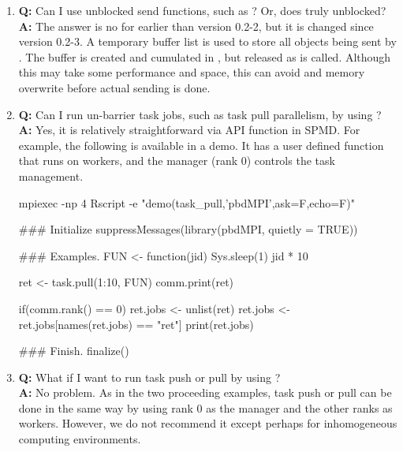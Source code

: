 \begin{enumerate}
\begin{Code}[title=SPMD R Script]
finalize()
\end{Code}


\item {\bf\color{blue} Q:}
      Can I use unblocked send functions, such as
      ? Or, does  truly unblocked? \\
      {\bf\color{blue} A:}
      The answer is no for  earlier than version 0.2-2, but
      it is changed since version 0.2-3. A temporary buffer list
       is used to store all objects being sent by
      . The buffer is created
      and cumulated in , but released as
       is called. Although this may take some performance
      and space, this can avoid  and memory overwrite before
      actual sending is done.


\item {\bf\color{blue} Q:}
      Can I run un-barrier task jobs, such as task pull parallelism,
      by using ? \\
      {\bf\color{blue} A:}
      Yes, it is relatively straightforward via  API function
       in SPMD. For example, the following is available
      in a demo. It has a user
      defined function  that runs on workers, and the manager
      (rank 0) controls the task management.
\begin{Command}
mpiexec -np 4 Rscript -e "demo(task_pull,'pbdMPI',ask=F,echo=F)"
\end{Command}
\begin{Code}[title=SPMD R Script (task\_pull)]
### Initialize
suppressMessages(library(pbdMPI, quietly = TRUE))

### Examples.
FUN <- function(jid){
  Sys.sleep(1)
  jid * 10
}

ret <- task.pull(1:10, FUN)
comm.print(ret)

if(comm.rank() == 0){
  ret.jobs <- unlist(ret)
  ret.jobs <- ret.jobs[names(ret.jobs) == "ret"]
  print(ret.jobs)
}

### Finish.
finalize()
\end{Code}


\item {\bf\color{blue} Q:}
      What if I want to run task push or pull by using ? \\
      {\bf\color{blue} A:}
      No problem. As in the two proceeding examples, task push or pull
      can be done in the same way by using rank 0 as the manager and
      the other ranks as workers. However, we do not recommend it
      except perhaps for inhomogeneous computing environments.


\end{enumerate}
